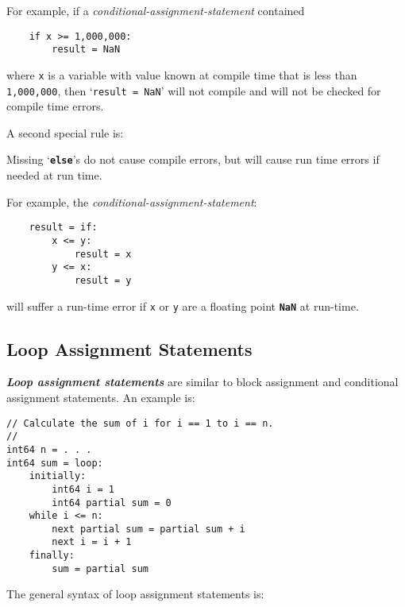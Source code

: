 \documentclass[12pt]{article}
\newcommand{\TT}[1]{{\tt \bfseries #1}}
\newcommand{\ikey}[2]{{\bf \em #1}\index{#2}}
\newenvironment{indpar}[1][0.3in]%
	{\begin{list}{}%
		     {\setlength{\itemsep}{0in}%
		      \setlength{\topsep}{0in}%
		      \setlength{\parsep}{1ex}%
		      \setlength{\labelwidth}{#1}%
		      \setlength{\leftmargin}{#1}%
		      \addtolength{\leftmargin}{\labelsep}}%
	 \item}%
	{\end{list}}
\begin{document}
For example, if a {\em conditional-assignment-statement}
contained
\begin{indpar}\begin{verbatim}
    if x >= 1,000,000:
        result = NaN
\end{verbatim}\end{indpar}
where {\tt x} is a variable with value known at compile time
that is less than {\tt 1,000,000}, then
`{\tt result = NaN}' will not compile
and will not be checked for compile time errors.


A second special rule is:

\begin{indpar}
Missing `\TT{else}'s do not cause compile errors,
but will cause run time errors if needed at run time.
\end{indpar}

For example, the {\em conditional-assignment-statement}:
\begin{indpar}\begin{verbatim}
    result = if:
        x <= y:
            result = x
        y <= x:
            result = y
\end{verbatim}\end{indpar}
will suffer a run-time error if {\tt x} or {\tt y} are
a floating point \TT{NaN} at run-time.

\subsection{Loop Assignment Statements}
\label{LOOP-ASSIGNMENT-STATEMENTS}

\ikey{Loop assignment statements}{loop assignment}
are similar to block assignment
and conditional assignment statements.  An example is:
\begin{indpar}\begin{verbatim}
// Calculate the sum of i for i == 1 to i == n.
//
int64 n = . . .
int64 sum = loop:
    initially:
        int64 i = 1
        int64 partial sum = 0
    while i <= n:
        next partial sum = partial sum + i
        next i = i + 1
    finally:
        sum = partial sum
\end{verbatim}\end{indpar}



The general syntax of loop assignment statements is:
\end{document}

